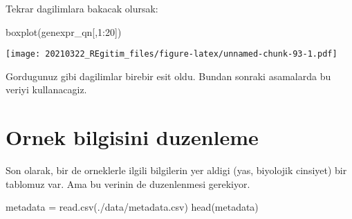 \documentclass[
]{book}
\newenvironment{Shaded}{\begin{snugshade}}{\end{snugshade}}
\newcommand{\DecValTok}[1]{\textcolor[rgb]{0.00,0.00,0.81}{#1}}
\newcommand{\FunctionTok}[1]{\textcolor[rgb]{0.00,0.00,0.00}{#1}}
\newcommand{\NormalTok}[1]{#1}
\newcommand{\OtherTok}[1]{\textcolor[rgb]{0.56,0.35,0.01}{#1}}
\newcommand{\SpecialCharTok}[1]{\textcolor[rgb]{0.00,0.00,0.00}{#1}}
\newcommand{\StringTok}[1]{\textcolor[rgb]{0.31,0.60,0.02}{#1}}
\begin{document}
Tekrar dagilimlara bakacak olursak:

\begin{Shaded}
\begin{Highlighting}[]
\FunctionTok{boxplot}\NormalTok{(genexpr\_qn[,}\DecValTok{1}\SpecialCharTok{:}\DecValTok{20}\NormalTok{])}
\end{Highlighting}
\end{Shaded}

\texttt{[image: 20210322\_REgitim\_files/figure-latex/unnamed-chunk-93-1.pdf]}

Gordugunuz gibi dagilimlar birebir esit oldu. Bundan sonraki asamalarda bu veriyi kullanacagiz.

\hypertarget{ornek-bilgisini-duzenleme}{%
\section{Ornek bilgisini duzenleme}\label{ornek-bilgisini-duzenleme}}

Son olarak, bir de orneklerle ilgili bilgilerin yer aldigi (yas, biyolojik cinsiyet) bir tablomuz var. Ama bu verinin de duzenlenmesi gerekiyor.

\begin{Shaded}
\begin{Highlighting}[]
\NormalTok{metadata }\OtherTok{=} \FunctionTok{read.csv}\NormalTok{(}\StringTok{\textquotesingle{}./data/metadata.csv\textquotesingle{}}\NormalTok{)}
\FunctionTok{head}\NormalTok{(metadata)}
\end{Highlighting}
\end{Shaded}
\end{document}
